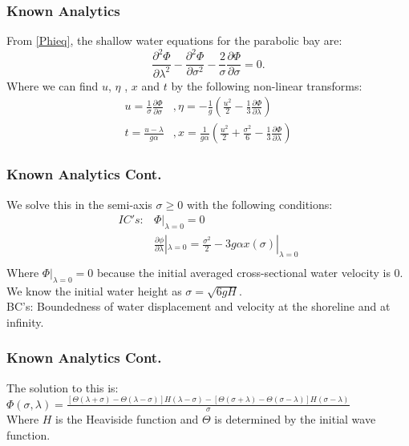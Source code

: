 \begin{frame}
\frametitle{Known Analytics}
From \eqref{Phieq}, the shallow water equations for the parabolic bay are: 
\[
\frac{\partial^2 \Phi}{\partial \lambda^2}-\frac{\partial^2 \Phi}{\partial \sigma^2}-\frac{2}{\sigma}\frac{\partial \Phi}{\partial \sigma}=0.
\]
Where we can find $u$, $\eta$ , $x$ and $t$ by the following non-linear transforms:\\
\begin{align*}
u=\frac{1}{\sigma}\frac{\partial \Phi}{\partial \sigma}&, \eta=-\frac{1}{g}\left(\frac{u^2}{2}-\frac{1}{3}\frac{\partial \Phi}{\partial \lambda}\right)\\
t=\frac{u-\lambda}{g\alpha}&,x=\frac{1}{g\alpha}\left(\frac{u^2}{2}+\frac{\sigma^2}{6}-\frac{1}{3}\frac{\partial \Phi}{\partial \lambda}\right)
\end{align*}
\end{frame}


\begin{frame}
\frametitle{Known Analytics Cont.}
We solve this in the semi-axis $\sigma \geq 0$ with the following conditions: \\
\begin{align*}
IC's:& \Phi|_{\lambda=0}=0\\
&\frac{\partial\phi}{\partial \lambda}|_{\lambda=0}=\frac{\sigma^2}{2}-3g\alpha x(\sigma)|_{\lambda=0}\\
\end{align*}
Where $\Phi|_{\lambda=0}=0$ because the initial averaged cross-sectional water velocity is 0. We know the initial water height as $\sigma=\sqrt{6gH}$.
\\ \vspace{3mm}
BC's: Boundedness of water displacement and velocity at the shoreline and at infinity.
\end{frame}

\begin{frame}
\frametitle{Known Analytics Cont.}
The solution to this is:\\\vspace{7mm}
$\Phi(\sigma,\lambda)=\frac{[\Theta(\lambda+\sigma)-\Theta(\lambda-\sigma)]H(\lambda-\sigma)-[\Theta(\sigma+\lambda)-\Theta(\sigma-\lambda)]H(\sigma-\lambda)}{\sigma}$\\\vspace{3mm}
Where $H$ is the Heaviside function and $\Theta$ is determined by the initial wave function.
\end{frame}

